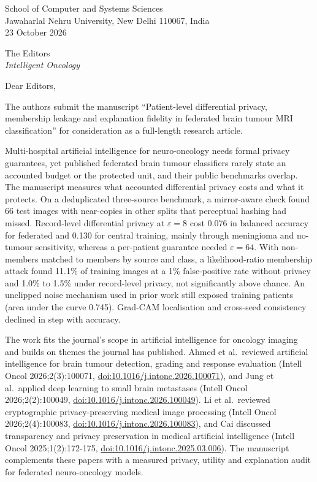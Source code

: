 \documentclass[11pt,a4paper]{article}
\begin{document}
\begin{flushright}
School of Computer and Systems Sciences\\
Jawaharlal Nehru University, New Delhi 110067, India\\
23 October 2026
\end{flushright}

The Editors\\
\textit{Intelligent Oncology}

Dear Editors,

The authors submit the manuscript ``Patient-level differential privacy, membership leakage and explanation fidelity in
federated brain tumour MRI classification'' for consideration as a full-length research article.

Multi-hospital artificial intelligence for neuro-oncology needs formal privacy guarantees, yet published federated
brain tumour classifiers rarely state an accounted budget or the protected unit, and their public benchmarks overlap.
The manuscript measures what accounted differential privacy costs and what it protects. On a deduplicated
three-source benchmark, a mirror-aware check found 66 test images with near-copies in other splits that perceptual
hashing had missed. Record-level differential privacy at $\varepsilon=8$ cost 0.076 in balanced accuracy for federated
and 0.130 for central training, mainly through meningioma and no-tumour sensitivity, whereas a per-patient guarantee
needed $\varepsilon=64$. With non-members matched to members by source and class, a likelihood-ratio membership attack
found 11.1\% of training images at a 1\% false-positive rate without privacy and 1.0\% to 1.5\% under record-level
privacy, not significantly above chance. An unclipped noise mechanism used in prior work still exposed training
patients (area under the curve 0.745). Grad-CAM localisation and cross-seed consistency declined in step with accuracy.

The work fits the journal's scope in artificial intelligence for oncology imaging and builds on themes the journal has
published. Ahmed et al.\ reviewed artificial intelligence for brain tumour detection, grading and response evaluation
(Intell Oncol 2026;2(3):100071, \href{https://doi.org/10.1016/j.intonc.2026.100071}{doi:10.1016/j.intonc.2026.100071}), and Jung et al.\ applied deep learning to small
brain metastases (Intell Oncol 2026;2(2):100049, \href{https://doi.org/10.1016/j.intonc.2026.100049}{doi:10.1016/j.intonc.2026.100049}). Li et al.\ reviewed
cryptographic privacy-preserving medical image processing (Intell Oncol 2026;2(4):100083,
\href{https://doi.org/10.1016/j.intonc.2026.100083}{doi:10.1016/j.intonc.2026.100083}), and Cai discussed transparency and privacy preservation in medical artificial
intelligence (Intell Oncol 2025;1(2):172-175, \href{https://doi.org/10.1016/j.intonc.2025.03.006}{doi:10.1016/j.intonc.2025.03.006}). The manuscript complements these
papers with a measured privacy, utility and explanation audit for federated neuro-oncology models.
\end{document}
